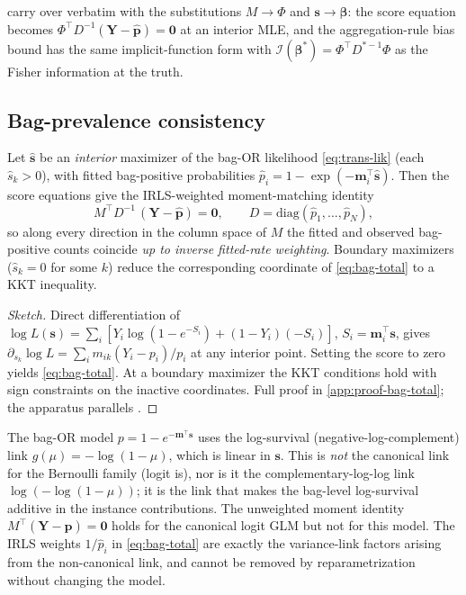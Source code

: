  carry over verbatim with the
substitutions $M \to \Phi$ and $\bm s \to \bm\beta$: the score
equation becomes $\Phi^\top D^{-1}(\bm Y - \hat{\bm p}) = \bm 0$ at
an interior MLE, and the aggregation-rule bias bound has the same
implicit-function form with $\mathcal{I}(\bm\beta^*) =
\Phi^\top D^{*-1} \Phi$ as the Fisher information at the truth.

\subsection{Bag-prevalence consistency}

\begin{theorem}
\label{thm:bag-total}
Let $\hat{\bm{s}}$ be an \emph{interior} maximizer of the bag-OR
likelihood \eqref{eq:trans-lik} (each $\hat s_k > 0$), with fitted
bag-positive probabilities
$\hat{p}_i = 1 - \exp(-\bm{m}_i^\top \hat{\bm{s}})$. Then the score
equations give the IRLS-weighted moment-matching identity
\begin{equation}
  M^\top D^{-1}\,(\bm{Y} - \hat{\bm{p}}) = \bm{0},
  \qquad D = \mathrm{diag}(\hat{p}_1, \ldots, \hat{p}_N),
  \label{eq:bag-total}
\end{equation}
so along every direction in the column space of $M$ the fitted and
observed bag-positive counts coincide \emph{up to inverse fitted-rate
weighting}. Boundary maximizers ($\hat s_k = 0$ for some $k$) reduce
the corresponding coordinate of \eqref{eq:bag-total} to a KKT
inequality.
\end{theorem}

\begin{proof}[Sketch]
Direct differentiation of $\log L(\bm s) = \sum_i [Y_i \log(1 - e^{-S_i})
+ (1-Y_i)(-S_i)]$, $S_i = \bm m_i^\top \bm s$, gives
$\partial_{s_k}\log L = \sum_i m_{ik}(Y_i - p_i)/p_i$ at any interior
point. Setting the score to zero yields \eqref{eq:bag-total}. At a
boundary maximizer the KKT conditions hold with sign constraints on
the inactive coordinates. Full proof in \cref{app:proof-bag-total};
the apparatus parallels \cite[\S 3]{towell2026scrnacoarsening}.
\end{proof}

\begin{remark}
The bag-OR model $p = 1 - e^{-\bm m^\top \bm s}$ uses the
log-survival (negative-log-complement) link $g(\mu) = -\log(1-\mu)$,
which is linear in $\bm s$. This is \emph{not} the canonical link
for the Bernoulli family (logit is), nor is it the
complementary-log-log link $\log(-\log(1-\mu))$; it is the link that
makes the bag-level log-survival additive in the instance
contributions. The unweighted moment identity $M^\top(\bm Y -
\hat{\bm p}) = \bm 0$ holds for the canonical logit GLM but not for
this model. The IRLS weights $1/\hat p_i$ in \eqref{eq:bag-total}
are exactly the variance-link factors arising from the
non-canonical link, and cannot be removed by reparametrization
without changing the model.
\end{remark}

